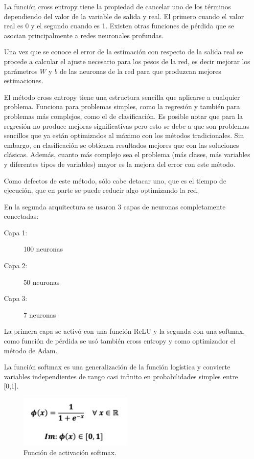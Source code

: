 \documentclass[runningheads]{llncs}
\begin{document}
La funci{\'o}n cross entropy tiene la propiedad de cancelar uno de los t{\'e}rminos dependiendo del valor de la variable de salida y real. El primero cuando el valor real es 0 y el segundo cuando es 1. Existen otras funciones de p{\'e}rdida que se asocian principalmente a redes neuronales profundas.

Una vez que se conoce el error de la estimaci{\'o}n con respecto de la salida real se procede a calcular el ajuste necesario para los pesos de la red, es decir mejorar los par{\'a}metros $W$ y $b$ de las neuronas de la red para que produzcan mejores estimaciones.

El m{\'e}todo cross entropy tiene una estructura sencilla que aplicarse a cualquier problema. Funciona para problemas simples, como la regresi{\'o}n y tambi{\'e}n para problemas m{\'a}s complejos, como el de clasificaci{\'o}n. Es posible notar que para la regresi{\'o}n no produce mejoras significativas pero esto se debe a que son problemas sencillos que ya est{\'a}n optimizados al m{\'a}ximo con los m{\'e}todos tradicionales. Sin embargo, en clasificaci{\'o}n se obtienen resultados mejores que con las soluciones cl{\'a}sicas. Adem{\'a}s, cuanto m{\'a}s complejo sea el problema (m{\'a}s clases, m{\'a}s variables y diferentes tipos de variables) mayor es la mejora del error con este m{\'e}todo.

Como defectos de este m{\'e}todo, s{\'o}lo cabe detacar uno, que es el tiempo de ejecuci{\'o}n, que en parte se puede reducir algo optimizando la red.

En la segunda arquitectura se usaron 3 capas de neuronas completamente conectadas:

\begin{description}
	\item[Capa 1:] 100 neuronas
	\item[Capa 2:] 50 neuronas
	\item[Capa 3:] 7 neuronas
\end{description}

La primera capa se activ{\'o} con una funci{\'o}n ReLU y la segunda con una softmax, como funci{\'o}n de p{\'e}rdida se us{\'o} tambi{\'e}n cross entropy y como optimizador el m{\'e}todo de Adam.

La funci{\'o}n softmax es una generalizaci{\'o}n de la funci{\'o}n log{\'i}stica y convierte variables independientes de rango casi infinito en probabilidades simples entre [0,1].

\begin{figure}
	\begin{center}
		\includegraphics[width=0.5\textwidth]{images/softmax.png}
		\caption{Funci{\'o}n de activaci{\'o}n softmax.} \label{softmax}
	\end{center}
\end{figure}
\end{document}
